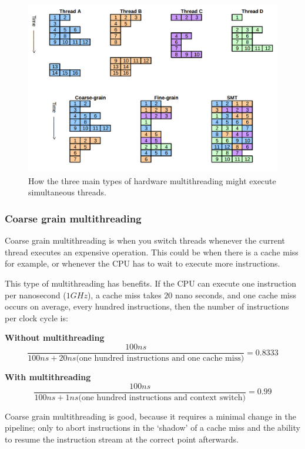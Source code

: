 \begin{figure}[H]
  \centering
  \includegraphics[width=\textwidth]{images/multithreading}
  \caption{How the three main types of hardware multithreading might execute
  simultaneous threads.}
  \label{hardware-multithreading-comparison}
\end{figure}

\subsubsection{Coarse grain multithreading}

Coarse grain multithreading is when you switch threads whenever the current
thread executes an expensive operation. This could be when there is a cache miss
for example, or whenever the CPU has to wait to execute more instructions.

This type of multithreading has benefits. If the CPU can execute one instruction
per nanosecond ($1GHz$), a cache miss takes $20$ nano seconds, and one cache
miss occurs on average, every hundred instructions, then the number of
instructions per clock cycle is:

\begin{description}
  \item \textbf{Without multithreading}
    \[
      \frac{100ns}{100ns + 20ns \text{(one hundred instructions and one cache miss)}} = 0.8333
    \]
  \item \textbf{With multithreading}
    \[
      \frac{100ns}{100ns + 1ns \text{(one hundred instructions and context switch)}} = 0.99
    \]
\end{description}

Coarse grain multithreading is good, because it requires a minimal change in the
pipeline; only to abort instructions in the `shadow' of a cache miss and the
ability to resume the instruction stream at the correct point afterwards.

